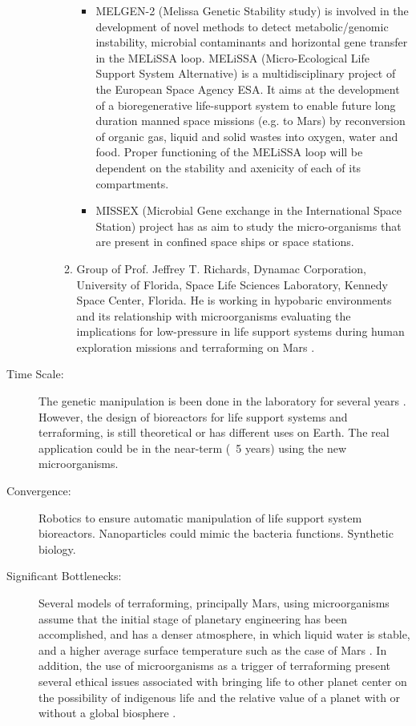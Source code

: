 \begin{description}
\begin{enumerate}
\begin{enumerate}
\begin{itemize}
\item  MELGEN-2 (Melissa Genetic   Stability study) is involved in the
development   of novel methods to detect metabolic/genomic instability,
microbial  contaminants and  horizontal gene transfer in the MELiSSA
loop.  MELiSSA (Micro-Ecological  Life Support System Alternative) is a
multidisciplinary   project of the European Space Agency ESA. It aims at
the  development of a  bioregenerative life-support system to enable
future  long duration manned space  missions (e.g. to Mars) by
reconversion   of organic gas, liquid and solid wastes into oxygen,
water  and food. Proper functioning  of the MELiSSA loop will be
dependent   on the stability and axenicity of each of its compartments.
 
\item  MISSEX (Microbial Gene  exchange  in the International Space
Station)   project has as aim to study the micro-organisms that are
present  in confined space ships or  space stations.
\end{itemize}

\item Group of Prof. Jeffrey T. Richards, Dynamac Corporation, University
of  Florida, Space Life Sciences  Laboratory, Kennedy Space Center,
Florida.   He is working in hypobaric environments and its relationship
with  microorganisms evaluating the  implications for low-pressure in
life   support systems during human exploration missions and
terraforming  on Mars \cite{Richards2006}.
\end{enumerate}
\end{enumerate}
\renewcommand{\labelenumi}{(\alph{enumi}}
\item[Time  Scale:] The genetic  manipulation is been done in the laboratory
for  several years  \cite{Stellwag1986}.  However, the design
of bioreactors for life support   systems and terraforming, is still
theoretical   or has different uses on Earth. The real application could
be  in the near-term (~5 years)  using the new microorganisms.
 
\item[Convergence:]  Robotics to  ensure automatic manipulation of life support
system  bioreactors. Nanoparticles  could mimic the bacteria functions.
Synthetic   biology.
 
\item[Significant  Bottlenecks:]  Several models of terraforming, principally
Mars,  using microorganisms assume  that the initial stage of planetary
engineering   has been accomplished, and has a denser atmosphere, in
which  liquid water is stable, and a  higher average surface temperature
such  as  the case of Mars \cite{McKay2001}.
In  addition, the use of  microorganisms as a trigger of terraforming
present  several ethical issues  associated with bringing life to other
planet   center on the possibility of indigenous life and the relative
value  of a planet with or without a  global biosphere \cite{Debus2008}.
\end{description}
 

